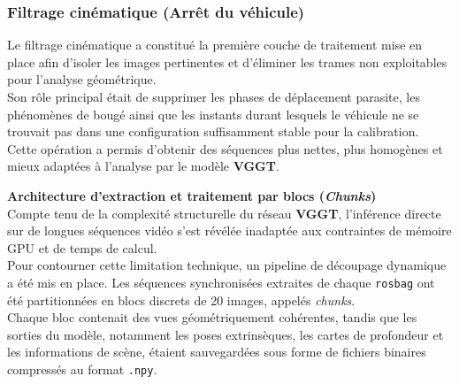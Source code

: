 \documentclass[12pt,a4paper,oneside]{report}
\begin{document}
\par\bigskip
\par\bigskip

\subsubsection{Filtrage cinématique (Arrêt du véhicule)}

\hspace*{.3cm}Le filtrage cinématique a constitué la première couche de traitement mise en place afin d'isoler les images pertinentes et d'éliminer les trames non exploitables pour l'analyse géométrique.\\

\hspace*{.3cm}Son rôle principal était de supprimer les phases de déplacement parasite, les phénomènes de bougé ainsi que les instants durant lesquels le véhicule ne se trouvait pas dans une configuration suffisamment stable pour la calibration.\\
\hspace*{.3cm}Cette opération a permis d'obtenir des séquences plus nettes, plus homogènes et mieux adaptées à l'analyse par le modèle \textbf{VGGT}.

\par\bigskip
\par\bigskip

\hspace*{0.4cm}\textbf{Architecture d'extraction et traitement par blocs (\textit{Chunks})}\\

\hspace*{.3cm}Compte tenu de la complexité structurelle du réseau \textbf{VGGT}, l'inférence directe sur de longues séquences vidéo s'est révélée inadaptée aux contraintes de mémoire GPU et de temps de calcul.\\

\hspace*{.3cm}Pour contourner cette limitation technique, un pipeline de découpage dynamique a été mis en place. Les séquences synchronisées extraites de chaque \texttt{rosbag} ont été partitionnées en blocs discrets de 20 images, appelés \textit{chunks}.\\
\hspace*{.3cm}Chaque bloc contenait des vues géométriquement cohérentes, tandis que les sorties du modèle, notamment les poses extrinsèques, les cartes de profondeur et les informations de scène, étaient sauvegardées sous forme de fichiers binaires compressés au format \texttt{.npy}.\\
\end{document}

